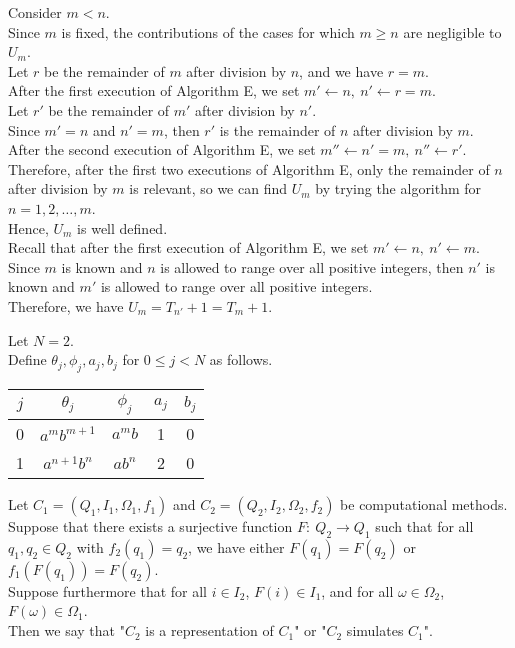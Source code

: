 \documentclass[letterpaper, reqno,11pt]{article}
\begin{document}
\medskip

 Consider $m<n$. \\
Since $m$ is fixed, the contributions of the cases for which $m\geq n$ are negligible to $U_m$. \\
Let $r$ be the remainder of $m$ after division by $n$, and we have $r=m$. \\
After the first execution of Algorithm E, we set $m'\leftarrow n,\ n'\leftarrow r=m$. \\
Let $r'$ be the remainder of $m'$ after division by $n'$. \\
Since $m'=n$ and $n'=m$, then $r'$ is the remainder of $n$ after division by $m$. \\
After the second execution of Algorithm E, we set $m''\leftarrow n'=m,\ n''\leftarrow r'$. \\
Therefore, after the first two executions of Algorithm E, only the remainder of $n$ after division by $m$ is relevant, so we can find $U_m$ by trying the algorithm for $n=1,2,\ldots,m$. \\
Hence, $U_m$ is well defined. \\
Recall that after the first execution of Algorithm E, we set $m'\leftarrow n,\ n'\leftarrow m$. \\
Since $m$ is known and $n$ is allowed to range over all positive integers, then $n'$ is known and $m'$ is allowed to range over all positive integers. \\
Therefore, we have $U_m=T_{n'}+1=T_m+1$.

\medskip

 Let $N=2$. \\
Define $\theta_j,\phi_j,a_j,b_j$ for $0\leq j<N$ as follows. \\
\begin{tabular}{c | c c c c}
    $j$ & $\theta_j$ & $\phi_j$ & $a_j$ & $b_j$ \\
    \hline
    0 & $a^mb^{m+1}$ & $a^mb$ & 1 & 0 \\
    1 & $a^{n+1}b^n$ & $ab^n$ & 2 & 0 \\
\end{tabular}

\medskip

 Let $C_1=\left(Q_1,I_1,\Omega_1,f_1\right)$ and $C_2=\left(Q_2,I_2,\Omega_2,f_2\right)$ be computational methods. \\
Suppose that there exists a surjective function $F\colon\ Q_2\rightarrow Q_1$ such that for all $q_1,q_2\in Q_2$ with $f_2\left(q_1\right)=q_2$, we have either $F\left(q_1\right)=F\left(q_2\right)$ or $f_1\left(F\left(q_1\right)\right)=F\left(q_2\right)$. \\
Suppose furthermore that for all $i\in I_2$, $F(i)\in I_1$, and for all $\omega\in\Omega_2$, $F(\omega)\in\Omega_1$. \\
Then we say that "$C_2$ is a representation of $C_1$" or "$C_2$ simulates $C_1$".
\end{document}
